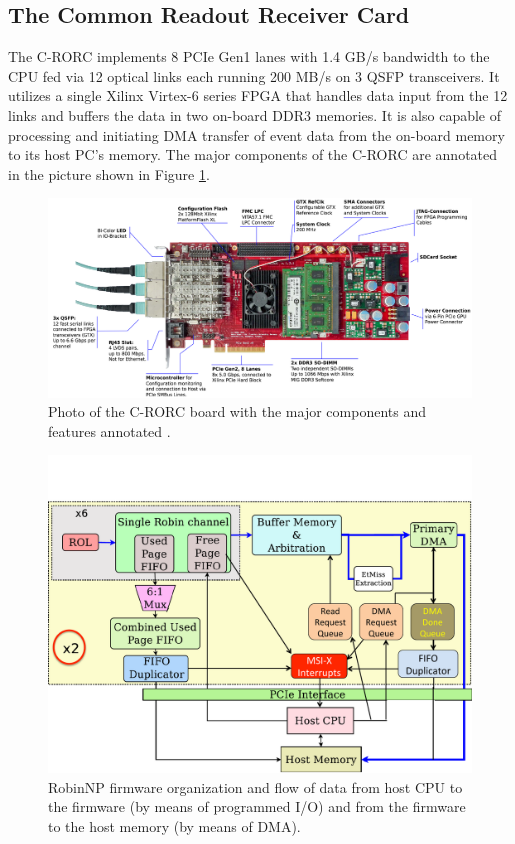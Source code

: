 \subsection{The Common Readout Receiver Card}\label{sec:crorc}

The C-RORC implements 8 PCIe Gen1 lanes with 1.4 GB/s bandwidth to the CPU fed via 12 optical links each running 200 MB/s on 3 QSFP transceivers. It utilizes a single Xilinx Virtex-6 series FPGA that handles data input from the 12 links and buffers the data in two on-board DDR3 memories. It is also capable of processing and initiating DMA transfer of event data from the on-board memory to its host PC's memory. The major components of the C-RORC are annotated 
in the picture shown in Figure \ref{fig:crorc}.


\begin{figure}[tbp] %
\centering
\includegraphics[width=\textwidth]{crorc.png}
\caption{Photo of the C-RORC board with the major components and features annotated \cite{crorc}.}
\label{fig:crorc}
\end{figure}

\begin{figure}[tbp] %
\centering
\includegraphics[trim = 0cm 0cm 0cm 2.5cm, clip, width=.71\textwidth]{RobinNP_Firmware}

\caption{RobinNP firmware organization
and  flow  of  data  from  host  CPU  to  the
firmware  (by  means  of  programmed  I/O)
and from the firmware to the host memory
(by means of DMA).}
\label{fig:robinnp_fw}
\end{figure}


